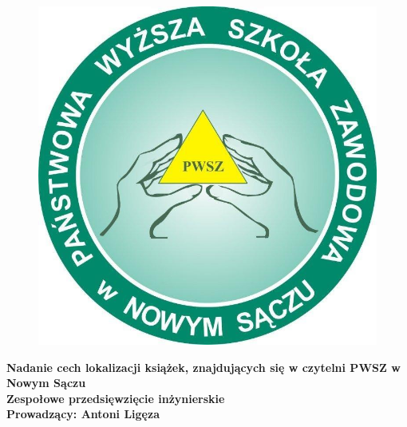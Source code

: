 
\def\autor{Informatyka Stosowana III rok}
\def\tytul{\textbf{\LARGE Zespołowe Przedsięwzięcie Inżynierskie}}
\def\promotor{~}
\def\miejscerokwydania{Nowy Sącz \today}
\def\nazwauczelni{PAŃSTWOWA WYŻSZA SZKOŁA ZAWODOWA}
\def\imienia{INSTYTUT  TECHNICZNY}
\def\wydzial{Kierunek Informatyka Stosowana}
\begin{figure}[H]
\centering
\includegraphics[scale=0.3]{czlonkowie/fig/logo.png}
\end{figure}
\thispagestyle{empty}
{
\hbox{}\textheight
\hspace{0.1cm}
\centering
\vbox{
\noindent\textbf{\Huge Nadanie cech lokalizacji książek,  znajdujących się w czytelni PWSZ w Nowym Sączu}\\
\vspace{0.5cm}
\noindent\textbf{\vspace{0.5cm}\huge Zespołowe przedsięwzięcie inżynierskie}\\
\noindent\textbf{\huge Prowadzący: Antoni Ligęza}}\\}



